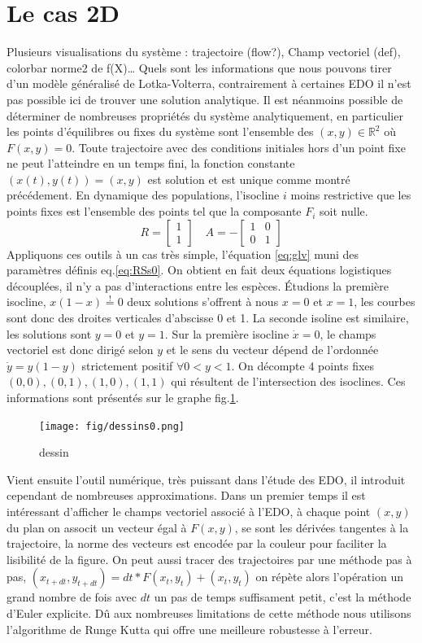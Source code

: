 \documentclass{wsdcr}
\begin{document}
\section{Le cas 2D}
\label{sec:lv2}
Plusieurs visualisations du système : trajectoire (flow?), Champ vectoriel (def), colorbar norme2 de f(X)…
Quels sont les informations que nous pouvons tirer d'un modèle généralisé de Lotka-Volterra, contrairement à certaines EDO il n'est pas possible ici de trouver une solution analytique. Il est néanmoins possible de déterminer de nombreuses propriétés du système analytiquement, en particulier les points d'équilibres ou fixes du système sont l'ensemble des $(x,y)\in \mathbb{R}^2$ où $F(x,y)=0$. Toute trajectoire avec des conditions initiales hors d'un point fixe ne peut l'atteindre en un temps fini, la fonction constante $(x(t),y(t))=(x,y)$ est solution et est unique comme montré précédement. En dynamique des populations, l'isocline $i$ moins restrictive que les points fixes est l'ensemble des points tel que la composante $F_i$ soit nulle.
\begin{equation}
R={\begin{bmatrix}1\\1\end{bmatrix}}\quad A =-{\begin{bmatrix}1&0\\0&1\end{bmatrix}}
\label{eq:RSs0}
\end{equation}
Appliquons ces outils à un cas très simple, l'équation \ref{eq:glv} muni des paramètres définis eq.\ref{eq:RSs0}. On obtient en fait deux équations logistiques découplées, il n'y a pas d'interactions entre les espèces. Étudions la première isocline, $x(1-x)\overset{!}{=}0$ deux solutions s'offrent à nous $x=0$ et $x=1$, les courbes sont donc des droites verticales d'abscisse 0 et 1. La seconde isoline est similaire, les solutions sont $y=0$ et $y=1$. Sur la première isocline $\dot{x}=0$, le champs vectoriel est donc dirigé selon $y$ et le sens du vecteur dépend de l'ordonnée $\dot{y}=y(1-y)$  strictement positif $\forall 0<y<1$. On décompte 4 points fixes ${(0,0),(0,1),(1,0),(1,1)}$ qui résultent de l'intersection des isoclines. Ces informations sont présentés sur le graphe fig.\ref{fig:dessinlv2s0}.
\begin{figure}[t!]
    \centering
    \texttt{[image: fig/dessins0.png]}
    \caption{dessin}
    \label{fig:dessinlv2s0}
\end{figure}
Vient ensuite l'outil numérique, très puissant dans l'étude des EDO, il introduit cependant de nombreuses approximations. Dans un premier temps il est intéressant d'afficher le champs vectoriel associé à l'EDO, à chaque point $(x,y)$ du plan on associt un vecteur égal à $F(x,y)$, se sont les dérivées tangentes à la trajectoire, la norme des vecteurs est encodée par la couleur pour faciliter la lisibilité de la figure. On peut aussi tracer des trajectoires par une méthode pas à pas, $(x_{t+dt},y_{t+dt})=dt*F(x_{t},y_{t})+(x_{t},y_{t})$ on répète alors l'opération un grand nombre de fois avec $dt$ un pas de temps suffisament petit, c'est la méthode d'Euler explicite. Dû aux nombreuses limitations de cette méthode nous utilisons l'algorithme de Runge Kutta qui offre une meilleure robustesse à l'erreur.
\end{document}
